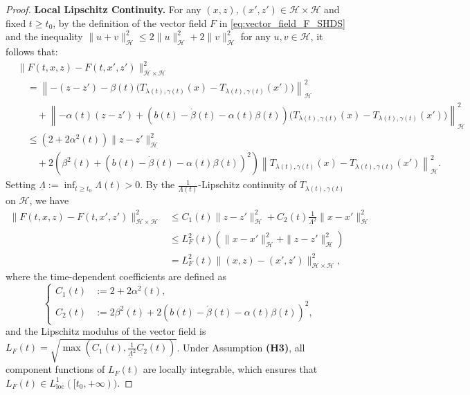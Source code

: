 \documentclass{article}
\theoremstyle{definition}
\theoremstyle{definition}
\theoremstyle{definition}
\begin{document}
\begin{proof}
\noindent \textbf{Local Lipschitz Continuity.} 
For any $(x, z), (x', z') \in \mathcal{H} \times \mathcal{H}$ and fixed $t \geq t_0$, by the definition of the vector field $F$ in \eqref{eq:vector_field_F_SHDS} and the inequality $\|u + v\|_{\mathcal{H}}^2 \leq 2\|u\|_{\mathcal{H}}^2 + 2\|v\|_{\mathcal{H}}^2$ for any $u, v \in \mathcal{H}$, it follows that:
\begin{align*}
& \|F(t, x, z) - F(t, x', z')\|_{\mathcal{H} \times \mathcal{H}}^2 \\
& \quad = \left\| -(z - z') - \beta(t) \big(T_{\lambda(t), \gamma(t)}(x) - T_{\lambda(t), \gamma(t)}(x')\big) \right\|_{\mathcal{H}}^2 \\
& \quad \quad + \left\| -\alpha(t)(z - z') + \left( b(t) - \dot{\beta}(t) - \alpha(t)\beta(t) \right) \big(T_{\lambda(t), \gamma(t)}(x) - T_{\lambda(t), \gamma(t)}(x')\big) \right\|_{\mathcal{H}}^2 \\
& \quad \le \left( 2 + 2\alpha^2(t) \right) \|z - z'\|_{\mathcal{H}}^2 \\
& \quad \quad + 2 \left( \beta^2(t) + \left( b(t) - \dot{\beta}(t) - \alpha(t)\beta(t) \right)^2 \right) \left\|T_{\lambda(t), \gamma(t)}(x) - T_{\lambda(t), \gamma(t)}(x')\right\|_{\mathcal{H}}^2.
\end{align*}
Setting $\underline{\Lambda} := \inf_{t \geq t_0} \Lambda(t) > 0$. By the $\frac{1}{\Lambda(t)}$-Lipschitz continuity of $T_{\lambda(t), \gamma(t)}$ on $\mathcal{H}$, we have
\begin{align*}
\|F(t, x, z) - F(t, x', z')\|_{\mathcal{H} \times \mathcal{H}}^2 &\le C_1(t) \|z - z'\|_{\mathcal{H}}^2 + C_2(t) \frac{1}{\underline{\Lambda}^2} \|x - x'\|_{\mathcal{H}}^2 \\
&\le L_F^2(t) \left( \|x - x'\|_{\mathcal{H}}^2 + \|z - z'\|_{\mathcal{H}}^2 \right) \\
&= L_F^2(t) \|(x, z) - (x', z')\|_{\mathcal{H} \times \mathcal{H}}^2,
\end{align*}
where the time-dependent coefficients are defined as
\begin{equation*}
\left\{
\begin{aligned}
C_1(t) &:= 2 + 2\alpha^2(t), \\
C_2(t) &:= 2\beta^2(t) + 2\left( b(t) - \dot{\beta}(t) - \alpha(t)\beta(t) \right)^2,
\end{aligned}
\right.
\end{equation*}
and the Lipschitz modulus of the vector field is $L_F(t) = \sqrt{\max\left( C_1(t), \frac{1}{\underline{\Lambda}^2} C_2(t) \right)}$. Under Assumption {\bf (H3)}, all component functions of $L_F(t)$ are locally integrable, which ensures that $L_F(t) \in L^1_{\mathrm{loc}}([t_0, +\infty))$.


\end{proof}
\end{document}
